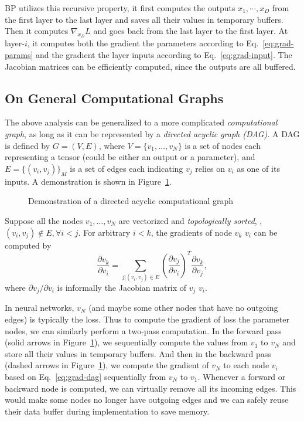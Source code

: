 BP utilizes this recursive property, it first computes the outputs $x_1, \cdots, x_D$ from the first layer to the last layer and saves all their values in temporary buffers. Then it computes $\nabla_{x_D}L$ and goes back from the last layer to the first layer. At layer-$i$, it computes both the gradient \wrt the parameters according to Eq.~\eqref{eq:grad-params} and the gradient \wrt the layer inputs according to Eq.~\eqref{eq:grad-input}. The Jacobian matrices can be efficiently computed, since the outputs are all buffered.

\subsection{On General Computational Graphs} %
\label{sub:dl-bp-on-graphs}
The above analysis can be generalized to a more complicated \emph{computational graph}, as long as it can be represented by a \emph{directed acyclic graph (DAG)}. A DAG is defined by $G=(V,E)$, where $V=\{v_1,\dots,v_N\}$ is a set of nodes each representing a tensor (could be either an output or a parameter), and $E=\{(v_i, v_j)\}_M$ is a set of edges each indicating $v_j$ relies on $v_i$ as one of its inputs. A demonstration is shown in Figure~\ref{fig:dl-dag}.
\begin{figure}[t]
\begin{center}
\fbox{\rule{0pt}{2in} \rule{0.9\linewidth}{0pt}}
\caption{Demonstration of a directed acyclic computational graph}
\label{fig:dl-dag}
\end{center}
\end{figure}

Suppose all the nodes $v_1,\dots,v_N$ are vectorized and \emph{topologically sorted}, \ie, $(v_i, v_j)\notin E, \forall i < j$. For arbitrary $i < k$, the gradients of node $v_k$ \wrt $v_i$ can be computed by
\begin{equation} \label{eq:grad-dag}
  \frac{\partial v_k}{\partial v_i} = \sum_{j | (v_i, v_j) \in E} \left(\frac{\partial v_j}{\partial v_i}\right)^T \frac{\partial v_k}{\partial v_j},
\end{equation}
where $\partial v_j/\partial v_i$ is informally the Jacobian matrix of $v_j$ \wrt $v_i$.

In neural networks, $v_N$ (and maybe some other nodes that have no outgoing edges) is typically the loss. Thus to compute the gradient of loss \wrt the parameter nodes, we can similarly perform a two-pass computation. In the forward pass (solid arrows in Figure~\ref{fig:dl-dag}), we sequentially compute the values from $v_1$ to $v_N$ and store all their values in temporary buffers. And then in the backward pass (dashed arrows in Figure~\ref{fig:dl-dag}), we compute the gradient of $v_N$ \wrt to each node $v_i$ based on Eq.~\eqref{eq:grad-dag} sequentially from $v_N$ to $v_1$. Whenever a forward or backward node is computed, we can virtually remove all its incoming edges. This would make some nodes no longer have outgoing edges and we can safely reuse their data buffer during implementation to save memory.





